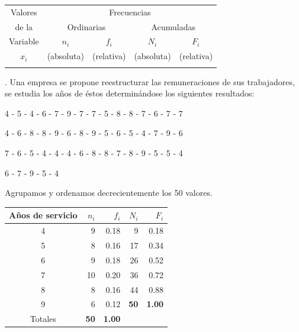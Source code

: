 \begin{table}[H]
\centering
\begin{tabular}{|c|c|c|c|c|}
\hline
Valores  & \multicolumn{4}{c|}{Frecuencias}                                  \\ \cline{2-5} 
de la    & \multicolumn{2}{c|}{Ordinarias} & \multicolumn{2}{c|}{Acumuladas} \\ \cline{2-5} 
Variable & $n_i$  & $f_i$    & $N_i$    & $F_i$  \\ \hline
$x_i$  & (absoluta)   & (relativa)  & (absoluta)  & (relativa) \\
  &  &  &  &     
\end{tabular}
\end{table}


\begin{example} .
	Una empresa se propone reestructurar las remuneraciones de sus trabajadores, se estudia los años de éstos determinándose los siguientes resultados: 
	
	\begin{center}
	4 - 5 - 4 - 6 - 7 - 9 - 7 - 7 - 5 - 8 - 8 - 7 - 6 - 7 - 7 
	
	4 - 6 - 8 - 8 - 9 - 6 - 8 - 9 - 5 - 6 - 5 - 4 - 7 - 9 - 6  
	
	7 - 6 - 5 - 4 - 4 - 4 - 6 - 8 - 8 - 7 - 8 - 9 - 5 - 5 - 4 
	
	6 - 7 - 9 - 5 - 4 \end{center}
	
	Agrupamos y ordenamos decrecientemente los 50 valores.
	
	\begin{table}[H]
	\centering
	\begin{tabular}{c|r|rrr}
	\textbf{Años de servicio} & $n_i$       & \multicolumn{1}{r|}{$f_i$} & \multicolumn{1}{r|}{$N_i$}       & $F_i$         \\ \hline
	4                         & 9           & \multicolumn{1}{r|}{0.18}  & \multicolumn{1}{r|}{9}           & 0.18          \\
	5                         & 8           & \multicolumn{1}{r|}{0.16}  & \multicolumn{1}{r|}{17}          & 0.34          \\
	6                         & 9           & \multicolumn{1}{r|}{0.18}  & \multicolumn{1}{r|}{26}          & 0.52          \\
	7                         & 10          & \multicolumn{1}{r|}{0.20}  & \multicolumn{1}{r|}{36}          & 0.72          \\
	8                         & 8           & \multicolumn{1}{r|}{0.16}  & \multicolumn{1}{r|}{44}          & 0.88          \\
	9                         & 6           & \multicolumn{1}{r|}{0.12}   & \multicolumn{1}{r|}{\textbf{50}} & \textbf{1.00} \\ \cline{1-3}
	Totales                   & \textbf{50} & \textbf{1.00}              &                                  &              
	\end{tabular}
	\end{table}
\end{example}

